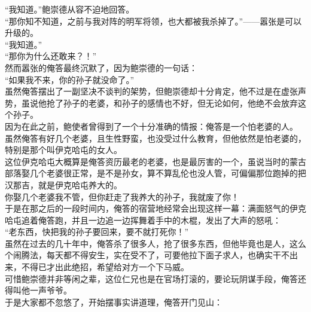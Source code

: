 \begin{multicols}{\theparacolNo}
“我知道。”鲍崇德从容不迫地回答。\\

“那你知不知道，之前与我对阵的明军将领，也大都被我杀掉了。”——嚣张是可以升级的。\\

“我知道。”\\

“那你为什么还敢来？！”\\

然而嚣张的俺答最终沉默了，因为鲍崇德的一句话：\\

“如果我不来，你的孙子就没命了。”\\

虽然俺答摆出了一副坚决不谈判的架势，但鲍崇德却十分肯定，他不过是在虚张声势，虽说他抢了孙子的老婆，和孙子的感情也不好，但无论如何，他绝不会放弃这个孙子。\\

因为在此之前，鲍使者曾得到了一个十分准确的情报：俺答是一个怕老婆的人。\\

虽然俺答有好几个老婆，且生性野蛮，也没受过什么教育，但他依然是怕老婆的，特别是那个叫伊克哈屯的女人。\\

这位伊克哈屯大概算是俺答资历最老的老婆，也是最厉害的一个，虽说当时的蒙古部落娶几个老婆很正常，是不是孙女，算不算乱伦也没人管，可偏偏那位跑掉的把汉那吉，就是伊克哈屯养大的。\\

你娶几个老婆我不管，但你赶走了我养大的孙子，我就废了你！\\

于是在那之后的一段时间内，俺答的宿营地经常会出现这样一幕：满面怒气的伊克哈屯追着俺答跑，并且一边追一边挥舞着手中的木棍，发出了大声的怒吼：\\

“老东西，快把我的孙子要回来，要不就打死你！”\\

虽然在过去的几十年中，俺答杀了很多人，抢了很多东西，但他毕竟也是人，这么个闹腾法，每天都不得安生，实在受不了，可要他拉下面子求人，也确实干不出来，不得已才出此绝招，希望给对方一个下马威。\\

可惜鲍崇德并非等闲之辈，这位仁兄也是在官场打滚的，要论玩阴谋手段，俺答还得叫他一声爷爷。\\

于是大家都不忽悠了，开始摆事实讲道理，俺答开门见山：\\


\end{multicols}
